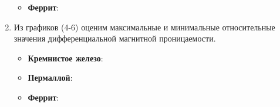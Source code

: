 \documentclass[12pt]{lab}
\begin{document}
\begin{enumerate}
\begin{itemize}
            \item  \textbf{Феррит}:


        \end{itemize}

    \item Из графиков (4-6) оценим максимальные и минимальные относительные значения
        дифференциальной магнитной проницаемости.

        \begin{itemize}
            \item   \textbf{Кремнистое железо}:


            \item  \textbf{Пермаллой}:


            \item  \textbf{Феррит}:


        \end{itemize}

\end{enumerate}
\end{document}
